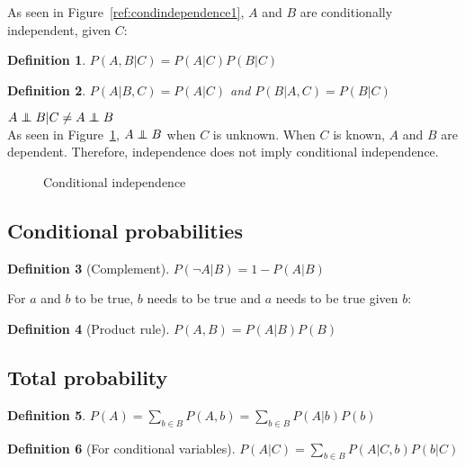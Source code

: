 \documentclass{report}
\newtheorem{definition}{Definition}[section]
\newcommand\independent{\protect\mathpalette{\protect\independenT}{\perp}}
\def\independenT#1#2{\mathrel{\rlap{$#1#2$}\mkern2mu{#1#2}}}
\begin{document}
As seen in Figure~\ref{ref:condindependence1}, $A$ and $B$ are conditionally independent, given $C$:
\begin{definition}
$P(A,B\vert C) = P(A\vert C)P(B\vert C)$
\end{definition}

\begin{definition}
$P(A\vert B,C) = P(A\vert C)$ and $P(B\vert A,C) = P(B\vert C)$
\end{definition}

$A\independent B \vert C \neq A\independent B$
\\

As seen in Figure~\ref{ref:condindependence2}, $A\independent B$ when $C$ is unknown. When $C$ is known, $A$ and $B$ are dependent. Therefore, independence does not imply conditional independence.


\begin{figure}[h!]
\centering
{}
\caption{Conditional independence}
\label{ref:condindependence2}
\end{figure}


\subsection{Conditional probabilities}
\begin{definition}[Complement]
$P(\neg A\vert B) = 1 - P(A\vert B)$
\end{definition}

For $a$ and $b$ to be true, $b$ needs to be true and $a$ needs to be true given $b$:
\begin{definition}[Product rule]
$P(A,B) =P(A\vert B)P(B)$
\end{definition}

\subsection{Total probability}
\begin{definition}
$P(A) = \sum_{b\in B}{P(A,b)} = \sum_{b\in B}{P(A\vert b)P(b)}$
\end{definition}

\begin{definition}[For conditional variables]
$P(A\vert C) = \sum_{b\in B}{P(A\vert C,b)P(b\vert C)}$
\end{definition}
\end{document}
